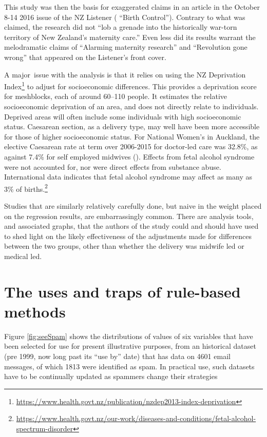 \documentclass[
  10ptls,
  b5paper]{book}
\begin{document}
This study was then the basis for exaggerated claims in an article in the October 8-14 2016 issue of the NZ Listener ( ``Birth Control''). Contrary to what was claimed, the research did not ``lob a grenade into the historically war-torn territory of New Zealand's maternity care.'' Even less did its results warrant the melodramatic claims of ``Alarming maternity research'' and ``Revolution gone wrong'' that appeared on the Listener's front cover.

A major~issue with the analysis is that it relies on using the NZ Deprivation Index\footnote{\url{https://www.health.govt.nz/publication/nzdep2013-index-deprivation}} to adjust for socioeconomic differences. This provides a deprivation score for meshblocks, each of around 60--110 people. It estimates the relative socioeconomic deprivation of an area, and does not directly relate to individuals. Deprived areas will often include some individuals with high socioeconomic status. Caesarean section, as a delivery type, may well have been more accessible for those of higher socioeconomic status. For National Women's in Auckland, the elective Caesarean rate at term over 2006-2015 for doctor-led care was 32.8\%, as against 7.4\% for self employed midwives (). Effects from fetal alcohol syndrome were not accounted for, nor were direct effects from substance abuse. International data indicates that fetal alcohol syndrome may affect as many as 3\% of births.\footnote{\url{https://www.health.govt.nz/our-work/diseases-and-conditions/fetal-alcohol-spectrum-disorder}}

Studies that are similarly relatively carefully done, but naive in the weight placed on the regression results, are embarrassingly common. There are analysis tools, and associated graphs, that the authors of the study could and should have used to shed light on the likely effectiveness of the adjustments made for differences between the two groups, other than whether the delivery was midwife led or medical led.

\section{The uses and traps of rule-based methods}\label{the-uses-and-traps-of-rule-based-methods}

Figure \ref{fig:seeSpam} shows the distributions of values of six variables that have been selected for use for present illustrative purposes, from an historical dataset (pre 1999, now long past its ``use by'' date) that has data on 4601 email messages, of which 1813 were identified as spam. In practical use, such datasets have to be continually updated as spammers change their strategies
\end{document}
